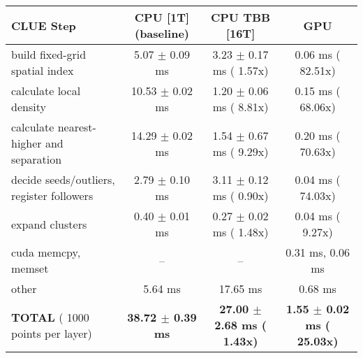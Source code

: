    \begin{tabular}{l|c|c|c}
    \hline
    CLUE Step                                 & CPU [1T] (baseline)         & CPU TBB [16T]                         & GPU                       \\ \hline
    build fixed-grid spatial index            &   5.07 $\pm$  0.09 ms       &   3.23 $\pm$  0.17 ms ( 1.57x)        &   0.06 ms ( 82.51x)       \\
    calculate local density                   &  10.53 $\pm$  0.02 ms       &   1.20 $\pm$  0.06 ms ( 8.81x)        &   0.15 ms ( 68.06x)       \\
    calculate nearest-higher and separation   &  14.29 $\pm$  0.02 ms       &   1.54 $\pm$  0.67 ms ( 9.29x)        &   0.20 ms ( 70.63x)       \\
    decide seeds/outliers, register followers &   2.79 $\pm$  0.10 ms       &   3.11 $\pm$  0.12 ms ( 0.90x)        &   0.04 ms ( 74.03x)       \\
    expand clusters                           &   0.40 $\pm$  0.01 ms       &   0.27 $\pm$  0.02 ms ( 1.48x)        &   0.04 ms (  9.27x)       \\ \hline
    cuda memcpy, memset                       & --                          & --                                    &   0.31 ms,   0.06 ms      \\ 
    other                                     &   5.64 ms                   &  17.65 ms                             &   0.68 ms                 \\ \hline
    \textbf{TOTAL} ( 1000 points per layer)   & \textbf{ 38.72 $\pm$  0.39 ms} & \textbf{ 27.00 $\pm$  2.68 ms ( 1.43x)} & \textbf{  1.55 $\pm$  0.02 ms ( 25.03x)}  \\
    \hline 
    \end{tabular}
    \linebreak


